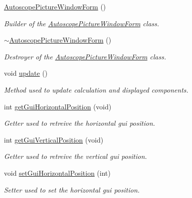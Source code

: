 \begin{DoxyCompactItemize}
\item 
\mbox{\hyperlink{class_autoscope_picture_window_form_ac7e1f8a94457cce24469119ea3214f8a}{Autoscope\+Picture\+Window\+Form}} ()
\begin{DoxyCompactList}\small\item\em Builder of the \mbox{\hyperlink{class_autoscope_picture_window_form}{Autoscope\+Picture\+Window\+Form}} class. \end{DoxyCompactList}\item 
\mbox{\hyperlink{class_autoscope_picture_window_form_a0ac8bae5bd9b170aea179812f0f516be}{$\sim$\+Autoscope\+Picture\+Window\+Form}} ()
\begin{DoxyCompactList}\small\item\em Destroyer of the \mbox{\hyperlink{class_autoscope_picture_window_form}{Autoscope\+Picture\+Window\+Form}} class. \end{DoxyCompactList}\item 
void \mbox{\hyperlink{class_autoscope_picture_window_form_a84ad64e4121c67a3269f935e50cfee2c}{update}} ()
\begin{DoxyCompactList}\small\item\em Method used to update calculation and displayed components. \end{DoxyCompactList}\item 
int \mbox{\hyperlink{class_autoscope_picture_window_form_ad9fa74865956b50029f0e2692ab256c8}{get\+Gui\+Horizontal\+Position}} (void)
\begin{DoxyCompactList}\small\item\em Getter used to retreive the horizontal gui position. \end{DoxyCompactList}\item 
int \mbox{\hyperlink{class_autoscope_picture_window_form_ad7eeabfc680448ec5f663f7c68f6e3f4}{get\+Gui\+Vertical\+Position}} (void)
\begin{DoxyCompactList}\small\item\em Getter used to retreive the vertical gui position. \end{DoxyCompactList}\item 
void \mbox{\hyperlink{class_autoscope_picture_window_form_a1a3b45dad146565be0f597e1b11cb910}{set\+Gui\+Horizontal\+Position}} (int)
\begin{DoxyCompactList}\small\item\em Setter used to set the horizontal gui position. \end{DoxyCompactList}\item 

\end{DoxyCompactItemize}
